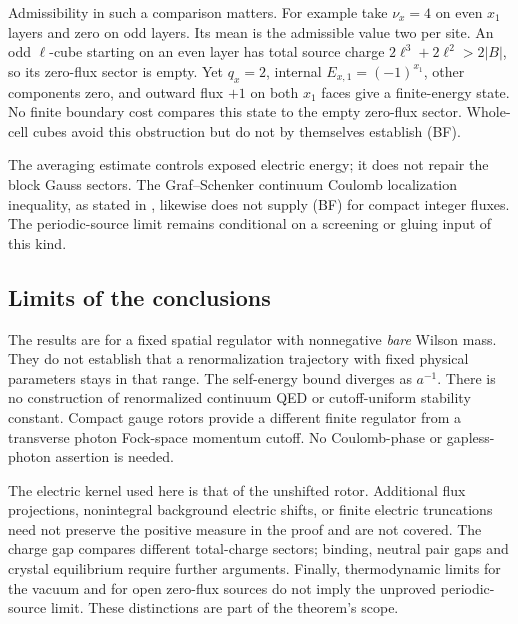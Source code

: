 Admissibility in such a comparison matters. For example take
$\nu_x=4$ on even $x_1$ layers and zero on odd layers. Its mean
is the admissible value two per site. An odd $\ell$-cube starting
on an even layer has total source charge
$2\ell^3+2\ell^2>2|B|$, so its zero-flux sector is empty.
Yet $q_x=2$, internal $E_{x,1}=(-1)^{x_1}$, other components
zero, and outward flux $+1$ on both $x_1$ faces give a
finite-energy state. No finite boundary cost compares this
state to the empty zero-flux sector. Whole-cell cubes avoid
this obstruction but do not by themselves establish (BF).

The averaging estimate controls exposed electric energy; it
does not repair the block Gauss sectors. The Graf--Schenker
continuum Coulomb localization inequality, as stated in
\cite[Theorem 2]{ThermoII}, likewise does not supply (BF) for
compact integer fluxes. The periodic-source limit remains
conditional on a screening or gluing input of this kind.

\subsection{Limits of the conclusions}

The results are for a fixed spatial regulator with nonnegative
\emph{bare} Wilson mass. They do not establish that a
renormalization trajectory with fixed physical parameters stays
in that range. The self-energy bound diverges as $a^{-1}$.
There is no construction of renormalized continuum QED or
cutoff-uniform stability constant.
Compact gauge rotors provide a different finite regulator from
a transverse photon Fock-space momentum cutoff. No Coulomb-phase
or gapless-photon assertion is needed.

The electric kernel used here is that of the unshifted rotor.
Additional flux projections, nonintegral background electric
shifts, or finite electric truncations need not preserve the
positive measure in the proof and are not covered.
The charge gap compares different total-charge sectors; binding,
neutral pair gaps and crystal equilibrium require further
arguments. Finally, thermodynamic limits for the vacuum and for
open zero-flux sources do not imply the unproved periodic-source
limit. These distinctions are part of the theorem's scope.
